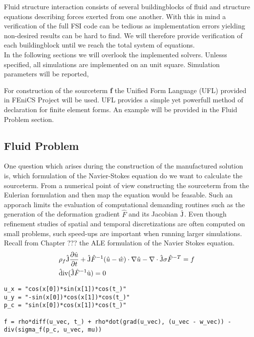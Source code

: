 Fluid structure interaction consists of several buildingblocks of fluid and structure equations describing forces exerted from one another. With this in mind a verification of the full FSI code can be tedious as implementation errors yielding non-desired results can be hard to find. We will therefore provide verification of each buildingblock until we reach the total system of equations. \\

In the following sections we will overlook the implemented solvers. Unlesss specified, all simulations are implemented on an unit square. Simulation parameters will be reported, 

For construction of the sourceterm \textbf{f} the Unified Form Language (UFL) \cite{Project2016} provided in FEniCS Project will be used. UFL provides a simple yet powerfull method of declaration for finite element forms. An example will be provided in the Fluid Problem section. 

\subsection{Fluid Problem}
One question which arises during the construction of the manufactured solution is, which formulation of the Navier-Stokes equation do we want to calculate the sourceterm. From a numerical point of view constructing the sourceterm from the Eulerian formulation and then map the equation would be feasable. Such an apporach limits the evaluation of computational demanding routines such as the generation of the deformation gradient $\hat{F}$ and its Jacobian $\text{\^{J}}$. Even though refinement studies of spatial and temporal discretizations are often computed on small problems, such speed-ups are important when running larger simulations. 
Recall from Chapter ??? the ALE formulation of the Navier Stokes equation. 
\begin{align*}
&\rho_f \text{\^{J}}\frac{\partial \hat{u}}{\partial t} + \text{\^{J}} \hat{F}^{-1} (\hat{u} - \hat{w})\cdot \nabla \hat{u} 
- \nabla \cdot \text{\^{J}} \sigma \hat{F}^{-T} = f \\
&\text{\^{div}}(\text{\^{J}}\hat{F}^{-1}\text{\^{u}}) = 0
\end{align*}


\begin{lstlisting}[style=python, caption={Descriptive Caption Text}, label=DescriptiveLabel, frame=single]
u_x = "cos(x[0])*sin(x[1])*cos(t_)"
u_y = "-sin(x[0])*cos(x[1])*cos(t_)"
p_c = "sin(x[0])*cos(x[1])*cos(t_)"

f = rho*diff(u_vec, t_) + rho*dot(grad(u_vec), (u_vec - w_vec)) -
div(sigma_f(p_c, u_vec, mu))
\end{lstlisting}

